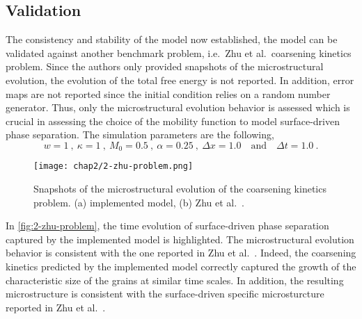     \subsection{Validation}
    The consistency and stability of the model now established, the model can be validated against another benchmark problem, i.e.\ Zhu et al.\ coarsening kinetics problem. Since the authors only provided snapshots of the microstructural evolution, the evolution of the total free energy is not reported. In addition, error maps are not reported since the initial condition relies on a random number generator. Thus, only the microstructural evolution behavior is assessed which is crucial in assessing the choice of the mobility function to model surface-driven phase separation.
    The simulation parameters are the following,
    \begin{equation}
        w = 1 \  , \ \kappa = 1 \ , \ M_0 = 0.5 \ , \ \alpha = 0.25 \ , \ \Delta x = 1.0 \quad \text{and} \quad \Delta t = 1.0 \ .
    \end{equation}
    \begin{figure}[H]
        \centering
        \texttt{[image: chap2/2-zhu-problem.png]}
        \caption{Snapshots of the microstructural evolution of the coarsening kinetics problem. (a) implemented model, (b) Zhu et al.\ \cite{ZhuChenShenTikare1999}.}
        \label{fig:2-zhu-problem}
    \end{figure}
    In \autoref{fig:2-zhu-problem}, the time evolution of surface-driven phase separation captured by the implemented model is highlighted. The microstructural evolution behavior is consistent with the one reported in Zhu et al.\ \cite{ZhuChenShenTikare1999}. Indeed, the coarsening kinetics predicted by the implemented model correctly captured the growth of the characteristic size of the grains at similar time scales. In addition, the resulting microstructure is consistent with the surface-driven specific microsturcture reported in Zhu et al.\ \cite{ZhuChenShenTikare1999}. 
